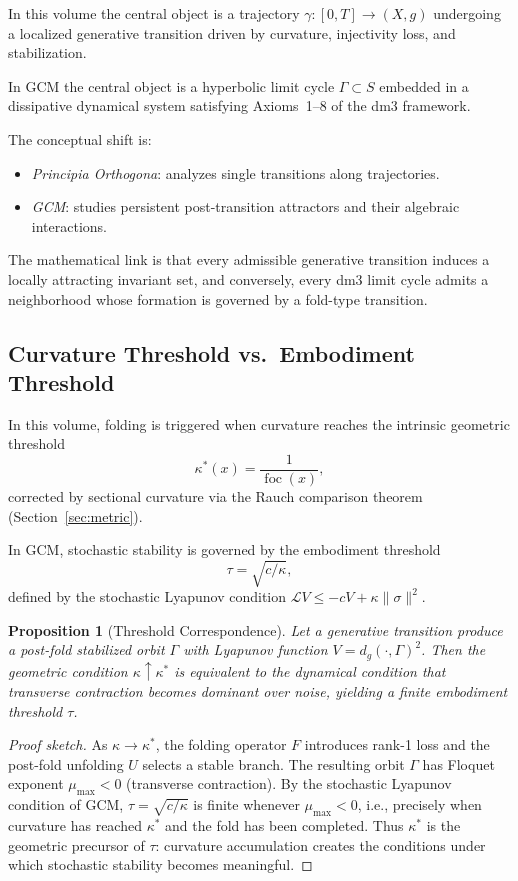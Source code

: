 \documentclass[12pt, oneside]{book}
\theoremstyle{plain}
\newtheorem{proposition}[theorem]{Proposition}
\theoremstyle{definition}
\theoremstyle{remark}
\begin{document}
In this volume the central object is a trajectory
$\gamma : [0,T] \to (X,g)$ undergoing a localized generative
transition driven by curvature, injectivity loss, and stabilization.

In GCM the central object is a hyperbolic limit cycle
$\Gamma \subset S$ embedded in a dissipative dynamical system
satisfying Axioms~1--8 of the dm3 framework.

The conceptual shift is:
\begin{itemize}[leftmargin=*]
  \item \emph{Principia Orthogona}: analyzes single transitions
        along trajectories.
  \item \emph{GCM}: studies persistent post-transition attractors
        and their algebraic interactions.
\end{itemize}

The mathematical link is that every admissible generative transition
induces a locally attracting invariant set, and conversely, every
dm3 limit cycle admits a neighborhood whose formation is governed by
a fold-type transition.

\subsection{Curvature Threshold vs.\ Embodiment Threshold}

In this volume, folding is triggered when curvature reaches the
intrinsic geometric threshold
\[
  \kappa^*(x) = \frac{1}{\operatorname{foc}(x)},
\]
corrected by sectional curvature via the Rauch comparison theorem
(Section~\ref{sec:metric}).

In GCM, stochastic stability is governed by the embodiment threshold
\[
  \tau = \sqrt{c/\kappa},
\]
defined by the stochastic Lyapunov condition
$\mathcal{L}V \le -cV + \kappa\|\sigma\|^2$.

\begin{proposition}[Threshold Correspondence]\label{prop:threshold}
Let a generative transition produce a post-fold stabilized orbit
$\Gamma$ with Lyapunov function $V = d_g(\cdot,\Gamma)^2$. Then
the geometric condition $\kappa \uparrow \kappa^*$ is equivalent to
the dynamical condition that transverse contraction becomes dominant
over noise, yielding a finite embodiment threshold $\tau$.
\end{proposition}

\begin{proof}[Proof sketch]
As $\kappa \to \kappa^*$, the folding operator $F$ introduces
rank-1 loss and the post-fold unfolding $U$ selects a stable branch.
The resulting orbit $\Gamma$ has Floquet exponent
$\mu_{\max} < 0$ (transverse contraction). By the stochastic
Lyapunov condition of GCM, $\tau = \sqrt{c/\kappa}$ is finite
whenever $\mu_{\max} < 0$, i.e., precisely when curvature has
reached $\kappa^*$ and the fold has been completed. Thus
$\kappa^*$ is the geometric precursor of $\tau$: curvature
accumulation creates the conditions under which stochastic stability
becomes meaningful.
\end{proof}
\end{document}
